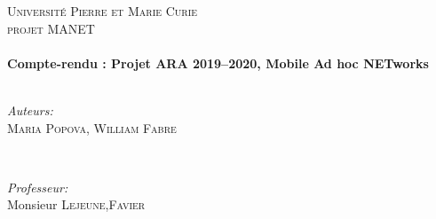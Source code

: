 \documentclass[11pt,a4paper,sans]{report}
\begin{document}
\begin{titlepage}

	\center %


	\textsc{\LARGE Université Pierre et Marie Curie}\\[1.5cm] %
	\textsc{\Large projet MANET}\\[0.5cm] %

	\vfill
	\HRule \\[0.4cm]
	{ \huge \bfseries Compte-rendu : Projet ARA 2019–2020, Mobile Ad hoc NETworks }\\[0.4cm] %
	\HRule \\[1.5cm]
	\vfill

	\begin{minipage}{0.4\textwidth}
		\begin{flushleft} \large
			\emph{Auteurs:}\\
			\textsc{Maria Popova, William Fabre} 
		\end{flushleft}
	\end{minipage}
	~
	\begin{minipage}{0.4\textwidth}
		\begin{flushright} \large
			\emph{Professeur:} \\
			Monsieur \textsc{Lejeune},\textsc{Favier}
		\end{flushright}
	\end{minipage}\\[2cm]




\end{titlepage}
\end{document}
